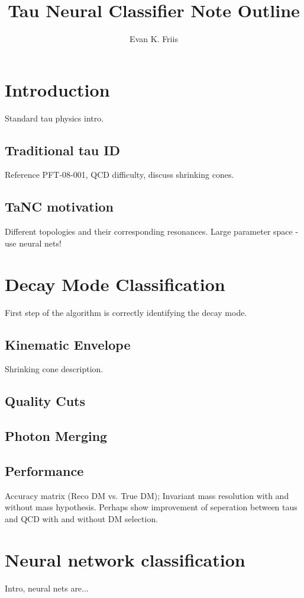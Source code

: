 \documentclass{article}
\title{Tau Neural Classifier Note Outline}
\author{Evan K. Friis}
\begin{document}
\maketitle 
\tableofcontents 

\section{Introduction}
Standard tau physics intro.

\subsection{Traditional tau ID}
Reference PFT-08-001, QCD difficulty, discuss shrinking cones.

\subsection{TaNC motivation}
Different topologies and their corresponding resonances.
Large parameter space - use neural nets!

\section{Decay Mode Classification}
First step of the algorithm is correctly identifying the decay mode.
\subsection{Kinematic Envelope}
Shrinking cone description.
\subsection{Quality Cuts}
\subsection{Photon Merging}
\subsection{Performance}
Accuracy matrix (Reco DM vs. True DM); Invariant mass resolution with and without mass hypothesis.  Perhaps show
improvement of seperation between taus and QCD with and without DM selection.

\section{Neural network classification}
Intro, neural nets are...
\end{document}
